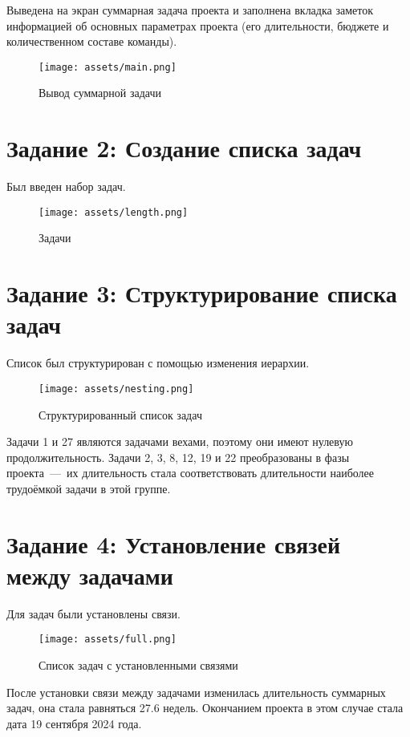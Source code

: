 Выведена на экран суммарная задача проекта и заполнена вкладка заметок информацией об основных параметрах проекта (его длительности, бюджете и количественном составе команды). 

\begin{figure}[H]
    \begin{center}
    \texttt{[image: assets/main.png]}
    \caption{Вывод суммарной задачи}
    \label{fig:2}
    \end{center}
\end{figure}

\newpage

\section{Задание 2: Создание списка задач}

Был введен набор задач.

\begin{figure}[H]
    \begin{center}
    \texttt{[image: assets/length.png]}
    \caption{Задачи}
    \label{fig:2}
    \end{center}
\end{figure}

\section{Задание 3: Структурирование списка задач}

Список был структурирован с помощью изменения иерархии. 

\begin{figure}[H]
    \begin{center}
    \texttt{[image: assets/nesting.png]}
    \caption{Структурированный список задач}
    \label{fig:2}
    \end{center}
\end{figure}

Задачи 1 и 27 являются задачами вехами, поэтому они имеют нулевую продолжительность. Задачи 2, 3, 8, 12, 19 и 22 преобразованы в фазы проекта~---~их длительность стала соответствовать длительности наиболее трудоёмкой задачи в этой группе.

\newpage

\section{Задание 4: Установление связей между задачами}

Для задач были установлены связи.

\begin{figure}[H]
    \begin{center}
    \texttt{[image: assets/full.png]}
    \caption{Список задач с установленными связями}
    \label{fig:2}
    \end{center}
\end{figure}

После установки связи между задачами изменилась длительность суммарных задач, она стала равняться 27.6 недель. Окончанием проекта в этом случае стала дата 19 сентября 2024 года.